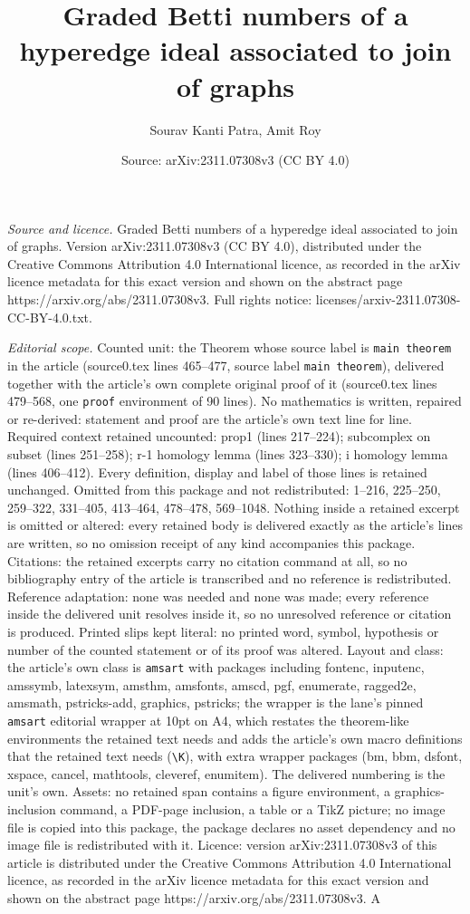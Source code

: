 \documentclass[10pt,a4paper]{amsart}
\title[Graded Betti numbers of a hyperedge ideal associated to join]{Graded Betti numbers of a hyperedge ideal associated to join of graphs}
\author{Sourav Kanti Patra, Amit Roy}
\date{Source: arXiv:2311.07308v3 (CC BY 4.0)}
\begin{document}
\maketitle

\noindent\emph{Source and licence.} Graded Betti numbers of a hyperedge ideal associated to join of graphs. Version arXiv:2311.07308v3 (CC BY 4.0), distributed under the Creative Commons Attribution 4.0 International licence, as recorded in the arXiv licence metadata for this exact version and shown on the abstract page https://arxiv.org/abs/2311.07308v3. Full rights notice: licenses/arxiv-2311.07308-CC-BY-4.0.txt.\par\smallskip

\noindent\textit{Editorial scope.} Counted unit: the Theorem whose source label is \texttt{main theorem} in the article (source0.tex lines 465--477, source label \texttt{main theorem}), delivered together with the article's own complete original proof of it (source0.tex lines 479--568, one \texttt{proof} environment of 90 lines). No mathematics is written, repaired or re-derived: statement and proof are the article's own text line for line. Required context retained uncounted: prop1 (lines 217--224); subcomplex on subset (lines 251--258); r-1 homology lemma (lines 323--330); i homology lemma (lines 406--412). Every definition, display and label of those lines is retained unchanged. Omitted from this package and not redistributed: 1--216, 225--250, 259--322, 331--405, 413--464, 478--478, 569--1048. Nothing inside a retained excerpt is omitted or altered: every retained body is delivered exactly as the article's lines are written, so no omission receipt of any kind accompanies this package. Citations: the retained excerpts carry no citation command at all, so no bibliography entry of the article is transcribed and no reference is redistributed. Reference adaptation: none was needed and none was made; every reference inside the delivered unit resolves inside it, so no unresolved reference or citation is produced. Printed slips kept literal: no printed word, symbol, hypothesis or number of the counted statement or of its proof was altered. Layout and class: the article's own class is \texttt{amsart} with packages including fontenc, inputenc, amssymb, latexsym, amsthm, amsfonts, amscd, pgf, enumerate, ragged2e, amsmath, pstricks-add, graphics, pstricks; the wrapper is the lane's pinned \texttt{amsart} editorial wrapper at 10pt on A4, which restates the theorem-like environments the retained text needs and adds the article's own macro definitions that the retained text needs (\texttt{\textbackslash K}), with extra wrapper packages (bm, bbm, dsfont, xspace, cancel, mathtools, cleveref, enumitem). The delivered numbering is the unit's own. Assets: no retained span contains a figure environment, a graphics-inclusion command, a PDF-page inclusion, a table or a TikZ picture; no image file is copied into this package, the package declares no asset dependency and no image file is redistributed with it. Licence: version arXiv:2311.07308v3 of this article is distributed under the Creative Commons Attribution 4.0 International licence, as recorded in the arXiv licence metadata for this exact version and shown on the abstract page https://arxiv.org/abs/2311.07308v3. A 
\end{document}
